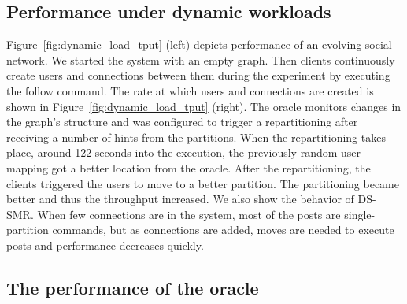 
\subsection{Performance under dynamic workloads}

Figure~\ref{fig:dynamic_load_tput} (left) depicts performance of an evolving social network.  
We started the system with an empty graph. Then clients
continuously create users and connections between them during the experiment
by executing the follow command.
The rate at which users and connections are created is shown in Figure~\ref{fig:dynamic_load_tput} (right).
The oracle monitors changes in the
graph's structure and was configured to trigger a repartitioning after receiving a number of hints
from the partitions.
When the repartitioning takes place, around 122 seconds into the execution, the previously random user mapping got a better location from the oracle.
After the repartitioning, the clients triggered the users to move to a better partition. 
The partitioning became better and thus the throughput increased.
We also show the behavior of DS-SMR.
When few connections are in the system, most of the posts are single-partition commands, but as connections are added, moves are needed to execute posts and performance decreases quickly.


\subsection{The performance of the oracle}

